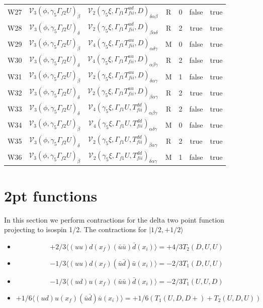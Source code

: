 \documentclass{article}[12pt]
\begin{document}
{\begin{landscape}
\begin{tabular}{ c c c c c c c }
W27& ${\mathcal V}_3(\phi,\gamma_5\Gamma_{f2}U)_{\beta}$   & ${\mathcal V}_2(\gamma_5\xi, \Gamma_{f1}   T^{ud}_{fii}, D)_{\delta\alpha\beta}$  & R & 0 & false  & true \\
W28& ${\mathcal V}_3(\phi,\gamma_5\Gamma_{f2}U)_{\delta}$  & ${\mathcal V}_2(\gamma_5\xi, \Gamma_{f1}   T^{ud}_{fii}, D)_{\beta\alpha\delta}$  & R & 2 & true   & true \\
W29& ${\mathcal V}_3(\phi,\gamma_5\Gamma_{f2}U)_{\beta}$   & ${\mathcal V}_4(\gamma_5\xi, \Gamma_{f1}   T^{uu}_{fii}, D)_{\alpha\delta\gamma}$ & M & 0 & false  & true \\
W30& ${\mathcal V}_3(\phi,\gamma_5\Gamma_{f2}U)_{\delta}$  & ${\mathcal V}_4(\gamma_5\xi, \Gamma_{f1}   T^{uu}_{fii}, D)_{\alpha\beta\gamma}$  & R & 2 & false  & true \\
W31& ${\mathcal V}_3(\phi,\gamma_5\Gamma_{f2}U)_{\beta}$   & ${\mathcal V}_2(\gamma_5\xi, \Gamma_{f1}   T^{uu}_{fii}, D)_{\delta\alpha\gamma}$ & M & 1 & false  & true \\
W32& ${\mathcal V}_3(\phi,\gamma_5\Gamma_{f2}U)_{\delta}$  & ${\mathcal V}_2(\gamma_5\xi, \Gamma_{f1}   T^{uu}_{fii}, D)_{\beta\alpha\gamma}$  & R & 2 & true   & true \\
W33& ${\mathcal V}_3(\phi,\gamma_5\Gamma_{f2}U)_{\delta}$  & ${\mathcal V}_4(\gamma_5\xi, \Gamma_{f1}   U, T^{dd}_{fii})_{\alpha\beta\gamma}$  & R & 2 & false  & true \\
W34& ${\mathcal V}_3(\phi,\gamma_5\Gamma_{f2}U)_{\beta}$   & ${\mathcal V}_4(\gamma_5\xi, \Gamma_{f1}   U, T^{dd}_{fii})_{\alpha\delta\gamma}$ & M & 0 & false  & true \\
W35& ${\mathcal V}_3(\phi,\gamma_5\Gamma_{f2}U)_{\delta}$  & ${\mathcal V}_2(\gamma_5\xi, \Gamma_{f1}   U, T^{dd}_{fii})_{\beta\alpha\gamma}$  & R & 2 & true   & true \\
W36& ${\mathcal V}_3(\phi,\gamma_5\Gamma_{f2}U)_{\beta}$   & ${\mathcal V}_2(\gamma_5\xi, \Gamma_{f1}   U, T^{dd}_{fii})_{\delta\alpha\gamma}$ & M & 1 & false  & true \\
\end{tabular}
\end{landscape}
}
\section{2pt functions}
In this section we perform contractions for the delta two point function
projecting to isospin 1/2. 
The contractions for $\vert 1/2, +1/2\rangle$
\begin{itemize}
\item $$+2/3\langle(uu)d\left(x_f\right)(\bar{u}\bar{u})\bar{d}\left(x_i\right)\rangle=+4/3T_2\left(D,U,U\right)$$
\item $$-1/3\langle(uu)d\left(x_f\right)(\bar{u}\bar{d})\bar{u}\left(x_i\right)\rangle=-2/3T_1\left(D,U,U\right)$$
\item $$-1/3\langle(ud)u\left(x_f\right)(\bar{u}\bar{u})\bar{d}\left(x_i\right)\rangle=-2/3T_1\left(U,U,D\right)$$
\item $$+1/6\langle(ud)u\left(x_f\right)(\bar{u}\bar{d})\bar{u}\left(x_i\right)\rangle=+1/6(T_1\left(U,D,D+\right)+T_2\left(U,D,U\right))$$
\end{itemize}
\end{document}
